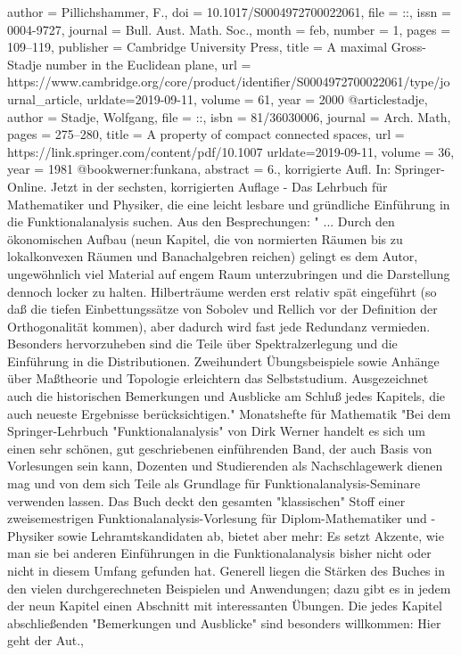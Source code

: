 {{author = {Pillichshammer, F.},
doi = {10.1017/S0004972700022061},
file = {::},
issn = {0004-9727},
journal = {Bull. Aust. Math. Soc.},
month = {feb},
number = {1},
pages = {109--119},
publisher = {Cambridge University Press},
title = {{A maximal Gross-Stadje number in the Euclidean plane}},
url = {https://www.cambridge.org/core/product/identifier/S0004972700022061/type/journal_article},
urldate={2019-09-11},
volume = {61},
year = {2000}
}
@article{stadje,
author = {Stadje, Wolfgang},
file = {::},
isbn = {81/36030006},
journal = {Arch. Math},
pages = {275--280},
title = {{A property of compact connected spaces}},
url = {https://link.springer.com/content/pdf/10.1007%
urldate={2019-09-11},
volume = {36},
year = {1981}
}
@book{werner:funkana,
abstract = {6., korrigierte Aufl. In: Springer-Online. Jetzt in der sechsten, korrigierten Auflage - Das Lehrbuch für Mathematiker und Physiker, die eine leicht lesbare und gründliche Einführung in die Funktionalanalysis suchen. Aus den Besprechungen: " ... Durch den ökonomischen Aufbau (neun Kapitel, die von normierten Räumen bis zu lokalkonvexen Räumen und Banachalgebren reichen) gelingt es dem Autor, ungewöhnlich viel Material auf engem Raum unterzubringen und die Darstellung dennoch locker zu halten. Hilberträume werden erst relativ spät eingeführt (so da{\ss} die tiefen Einbettungssätze von Sobolev und Rellich vor der Definition der Orthogonalität kommen), aber dadurch wird fast jede Redundanz vermieden. Besonders hervorzuheben sind die Teile über Spektralzerlegung und die Einführung in die Distributionen. Zweihundert Übungsbeispiele sowie Anhänge über Ma{\ss}theorie und Topologie erleichtern das Selbststudium. Ausgezeichnet auch die historischen Bemerkungen und Ausblicke am Schlu{\ss} jedes Kapitels, die auch neueste Ergebnisse berücksichtigen." Monatshefte für Mathematik "Bei dem Springer-Lehrbuch "Funktionalanalysis" von Dirk Werner handelt es sich um einen sehr schönen, gut geschriebenen einführenden Band, der auch Basis von Vorlesungen sein kann, Dozenten und Studierenden als Nachschlagewerk dienen mag und von dem sich Teile als Grundlage für Funktionalanalysis-Seminare verwenden lassen. Das Buch deckt den gesamten "klassischen" Stoff einer zweisemestrigen Funktionalanalysis-Vorlesung für Diplom-Mathematiker und -Physiker sowie Lehramtskandidaten ab, bietet aber mehr: Es setzt Akzente, wie man sie bei anderen Einführungen in die Funktionalanalysis bisher nicht oder nicht in diesem Umfang gefunden hat. Generell liegen die Stärken des Buches in den vielen durchgerechneten Beispielen und Anwendungen; dazu gibt es in jedem der neun Kapitel einen Abschnitt mit interessanten Übungen. Die jedes Kapitel abschlie{\ss}enden "Bemerkungen und Ausblicke" sind besonders willkommen: Hier geht der Aut.},
}}}
